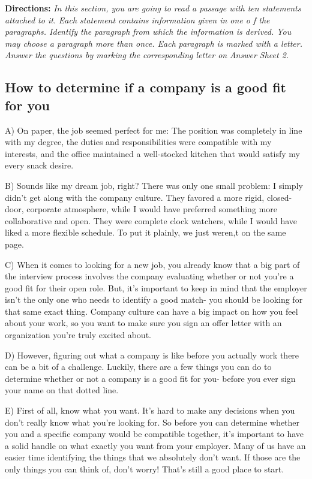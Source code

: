 \documentclass[UTF8,11pt]{ctexart}
\begin{document}
\textbf{Directions: }\textit{In this section, you are going to read a passage with ten statements attached to it.} \textit{Each statement contains information given in one o f the paragraphs. Identify the paragraph} \textit{from which the information is derived. You may choose a paragraph more than once. Each} \textit{paragraph is marked with a letter. Answer the questions by marking the corresponding letter on} \textit{Answer Sheet 2.}


\subsection*{\textbf{How to determine if a company is a good fit for you}}


A) On paper, the job seemed perfect for me: The position was completely in line with my degree, the duties and responsibilities were compatible with my interests, and the office maintained a well-stocked kitchen that would satisfy my every snack desire.


B) Sounds like my dream job, right? There was only one small problem: I simply didn't get along with the company culture. They favored a more rigid, closed-door, corporate atmosphere, while I would have preferred something more collaborative and open. They were complete clock watchers, while I would have liked a more flexible schedule. To put it plainly, we just weren,t on the same page.


C) When it comes to looking for a new job, you already know that a big part of the interview process involves the company evaluating whether or not you're a good fit for their open role. But, it's important to keep in mind that the employer isn't the only one who needs to identify a good match- you should be looking for that same exact thing. Company culture can have a big impact on how you feel about your work, so you want to make sure you sign an offer letter with an organization you're truly excited about.


D) However, figuring out what a company is like before you actually work there can be a bit of a challenge. Luckily, there are a few things you can do to determine whether or not a company is a good fit for you- before you ever sign your name on that dotted line.


E) First of all, know what you want. It's hard to make any decisions when you don't really know what you're looking for. So before you can determine whether you and a specific company would be compatible together, it's important to have a solid handle on what exactly you want from your employer. Many of us have an easier time identifying the things that we absolutely don't want. If those are the only things you can think of, don't worry! That's still a good place to start.
\end{document}
